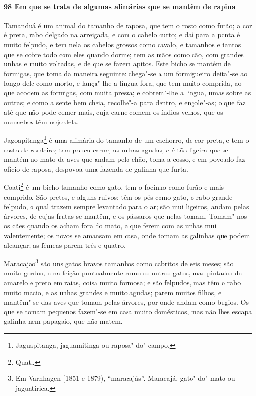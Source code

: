 \begin{linenumbers}
\paragraph{98 Em que se trata de algumas alimárias que se mantêm de rapina}\quad
Tamanduá é um animal do tamanho de raposa, que tem o rosto como furão; a cor é preta, rabo
delgado na arreigada, e com o cabelo curto; e daí para a ponta é muito felpudo, e tem nela
os cabelos grossos como cavalo, e tamanhos e tantos que se cobre todo com eles quando
dorme; tem as mãos como cão, com grandes unhas e muito voltadas, e de que se fazem apitos.
Este bicho se mantém de formigas, que toma da maneira seguinte: chega"-se a um formigueiro
deita"-se ao longo dele como morto, e lança"-lhe a língua fora, que tem muito comprida, ao
que acodem as formigas, com muita pressa; e cobrem"-lhe a língua, umas sobre as outras; e
como a sente bem cheia, recolhe"-a para dentro, e engole"-as; o que faz até que não pode
comer mais, cuja carne comem os índios velhos, que os mancebos têm nojo dela.

Jagoapitanga\footnote{ Jaguapitanga, jaguamitinga ou raposa"-do"-campo.} é uma alimária do
tamanho de um cachorro, de cor preta, e tem o rosto de cordeiro; tem pouca carne, as unhas
agudas, e é tão ligeira que se mantém no mato de aves que andam pelo chão, toma a cosso, e
em povoado faz ofício de raposa, despovoa uma fazenda de galinha que furta.

Coati\footnote{ Quati.} é um bicho tamanho como gato, tem o focinho como furão e mais
comprido. São pretos, e alguns ruivos; têm os pés como gato, o rabo grande felpudo, o qual
trazem sempre levantado para o ar; são mui ligeiros, andam pelas árvores, de cujas frutas
se mantêm, e os pássaros que nelas tomam. Tomam"-nos os cães quando os acham fora do mato,
a que ferem com as unhas mui valentemente; os novos se amansam em casa, onde tomam as
galinhas que podem alcançar; as fêmeas parem três e quatro.

Maracajao\footnote{Em Varnhagen (1851 e 1879), ``maracajás''. Maracajá, gato"-do"-mato ou
jaguatirica.} são uns gatos bravos tamanhos como cabritos de seis meses; são muito gordos,
e na feição pontualmente como os outros gatos, mas pintados de amarelo e preto em raias,
coisa muito formosa; e são felpudos, mas têm o rabo muito macio, e as unhas grandes e
muito agudas; parem muitos filhos, e mantêm"-se das aves que tomam pelas árvores, por onde
andam como bugios. Os que se tomam pequenos fazem"-se em casa muito domésticos, mas não
lhes escapa galinha nem papagaio, que não matem.



\end{linenumbers}
